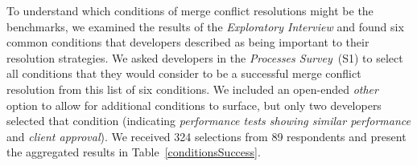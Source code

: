 
To understand which conditions of merge conflict resolutions might be the benchmarks, we examined the results of the \textit{Exploratory Interview} and found six common conditions that developers described as being important to their resolution strategies.
We asked developers in the \textit{Processes Survey}~(S1) to select all conditions that they would consider to be a successful merge conflict resolution from this list of six conditions.
We included an open-ended \textit{other} option to allow for additional conditions to surface, but only two developers selected that condition (indicating \textit{performance tests showing similar performance} and \textit{client approval}).
We received 324 selections from 89 respondents and present the aggregated results in Table~\ref{conditionsSuccess}.

